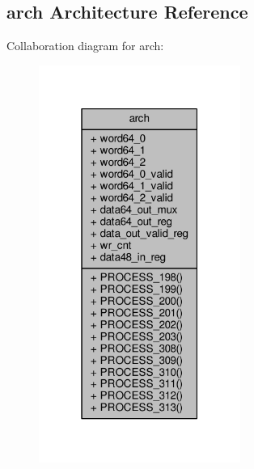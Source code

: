 \subsection{arch Architecture Reference}
\label{classpack__48__to__64_1_1arch}


Collaboration diagram for arch\+:\nopagebreak
\begin{figure}[H]
\begin{center}
\leavevmode
\includegraphics[width=187pt]{da/dd6/classpack__48__to__64_1_1arch__coll__graph}
\end{center}
\end{figure}
